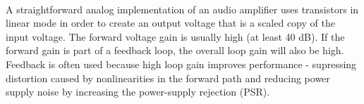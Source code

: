 \paragraph{} 
A straightforward analog implementation of an audio amplifier uses transistors in linear mode in order to create an output voltage that is a scaled copy of the input voltage. The forward voltage gain is usually high (at least 40 dB). If the forward gain is part of a feedback loop, the overall loop gain will also be high. Feedback is often used because high loop gain improves performance - supressing distortion caused by nonlinearities in the forward path and reducing power supply noise by increasing the power-supply rejection (PSR).
